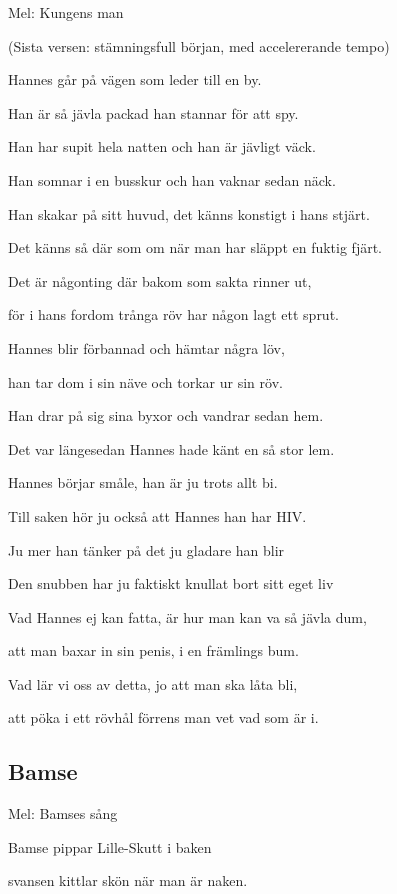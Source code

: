 Mel: Kungens man

(Sista versen: stämningsfull början, med accelererande tempo)\bigskip


Hannes går på vägen som leder till en by.

Han är så jävla packad han stannar för att spy.

Han har supit hela natten och han är jävligt väck.

Han somnar i en busskur och han vaknar sedan näck.\bigskip



Han skakar på sitt huvud, det känns konstigt i hans stjärt.

Det känns så där som om när man har släppt en fuktig fjärt.

Det är någonting där bakom som sakta rinner ut,

för i hans fordom trånga röv har någon lagt ett sprut. \bigskip



Hannes blir förbannad och hämtar några löv,

han tar dom i sin näve och torkar ur sin röv.

Han drar på sig sina byxor och vandrar sedan hem.

Det var längesedan Hannes hade känt en så stor lem.\bigskip



Hannes börjar småle, han är ju trots allt bi.

Till saken hör ju också att Hannes han har HIV.

Ju mer han tänker på det ju gladare han blir

Den snubben har ju faktiskt knullat bort sitt eget liv\bigskip



Vad Hannes ej kan fatta, är hur man kan va så jävla dum,

att man baxar in sin penis, i en främlings bum.

Vad lär vi oss av detta, jo att man ska låta bli,

att pöka i ett rövhål förrens man vet vad som är i.\bigskip


\subsection{\textbf{Bamse}}

Mel: Bamses sång\bigskip


Bamse pippar Lille-Skutt i baken

svansen kittlar skön när man är naken.

